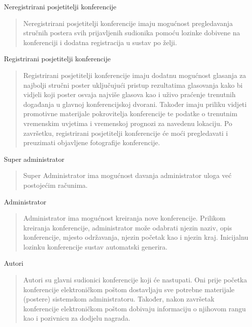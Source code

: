 			
			\begin{packed_enum}
				\item Neregistrirani posjetitelji konferencije
				
			\begin{quote}
				Neregistrirani posjetitelji konferencije imaju mogućnost pregledavanja stručnih postera svih prijavljenih sudionika pomoću lozinke dobivene na konferenciji i dodatna registracija u sustav po želji.
			\end{quote}
				
				\item Registrirani posjetitelji konferencije
				
		\begin{quote}
			Registrirani posjetitelji konferencije imaju dodatnu mogućnost glasanja za najbolji stručni poster uključujući pristup rezultatima glasovanja kako bi vidjeli koji poster osvaja najviše glasova kao i uživo praćenje trenutnih događanja u glavnoj konferencijskoj dvorani. Također imaju priliku vidjeti promotivne materijale pokrovitelja konferencije te podatke o trenutnim vremenskim uvjetima i vremenskoj prognozi za navedenu lokaciju. Po završetku, registrirani posjetitelji konferencije će moći pregledavati i preuzimati objavljene fotografije konferencije.
		\end{quote}
		
				\item Super administrator
				\begin{quote}
					Super Administrator ima mogućnost davanja administrator uloga već postojećim računima.
				\end{quote}
				
				\item Administrator
				\begin{quote}
					Administrator ima mogućnost kreiranja nove konferencije. Prilikom kreiranja konferencije, administrator može odabrati njezin naziv, opis konferencije, mjesto održavanja, njezin početak kao i njezin kraj. Inicijalnu lozinku konferencije sustav automatski generira.
				\end{quote}
				
				\item Autori
				\begin{quote}
					Autori su glavni sudionici konferencije koji će nastupati. Oni prije početka konferencije elektroničkom poštom dostavljaju sve potrebne materijale (postere) sistemskom administratoru. Također, nakon završetak konferencije elektroničkom poštom dobivaju informaciju o njihovom rangu kao i pozivnicu za dodjelu nagrada.
				\end{quote}
				

\end{packed_enum}
